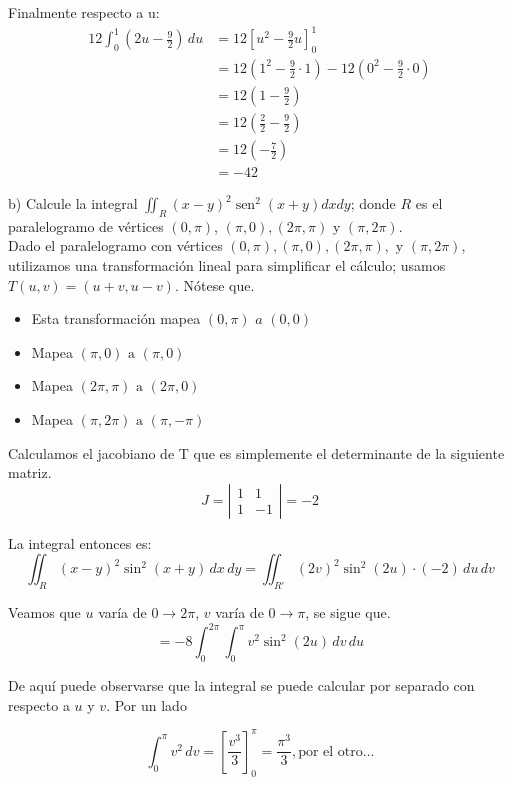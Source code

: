 Finalmente respecto a u:
\begin{align*}
12 \int_{0}^{1} \left(2u - \frac{9}{2}\right) \, du
&= 12 \left[ u^2 - \frac{9}{2}u \right]_{0}^{1}  \\
&= 12 \left(1^2 - \frac{9}{2} \cdot 1\right) - 12 \left(0^2 - \frac{9}{2} \cdot 0\right)  \\
&= 12 \left(1 - \frac{9}{2}\right) \\
&= 12 \left(\frac{2}{2} - \frac{9}{2}\right) \\
&= 12 \left(-\frac{7}{2}\right) \\
&= -42 
\end{align*}

b) Calcule la integral \( \iint_{R}(x-y)^{2} \operatorname{sen}^{2}(x+y) d x d y \); donde \( R \) es el paralelogramo de vértices \( (0, \pi) \), \( (\pi, 0),(2 \pi, \pi) \) y \( (\pi, 2 \pi) \). \\

Dado el paralelogramo con vértices $(0,\pi), (\pi,0), (2\pi,\pi),\text{ y }(\pi,2\pi)$, utilizamos una transformación lineal para simplificar el cálculo; usamos $T(u,v)=(u+v,u−v)$. Nótese que.
\begin{itemize}
    \item Esta transformación mapea $(0,\pi)\textit{ a }(0,0)$
    \item Mapea $(\pi,0)\text{ a }(\pi,0)$
    \item Mapea $(2\pi,\pi)\text{ a }(2\pi,0)$
    \item Mapea $(\pi,2\pi)\text{ a }(\pi,−\pi)$
\end{itemize}

Calculamos el jacobiano de T que es simplemente el determinante de la siguiente matriz.
\[
   J = \left| \begin{matrix} 
   1 & 1 \\ 
   1 & -1 
   \end{matrix} \right| = -2
   \]

La integral entonces es:
\[
   \iint_{R} (x-y)^2 \sin^2(x+y) \, dx \, dy = \iint_{R'} (2v)^2 \sin^2(2u) \cdot (-2) \, du \, dv
   \]

Veamos que $u$ varía de $0 \rightarrow 2\pi$, $v$ varía de $0 \rightarrow \pi$, se sigue que.
\[
   = -8 \int_{0}^{2\pi} \int_{0}^{\pi} v^2 \sin^2(2u) \, dv \, du
   \]

De aquí puede observarse que la integral se puede calcular por separado con respecto a $u$ y $v$. Por un lado

\[
     \int_{0}^{\pi} v^2 \, dv = \left[ \frac{v^3}{3} \right]_{0}^{\pi} = \frac{\pi^3}{3}, \text{por el otro...}
     \]

